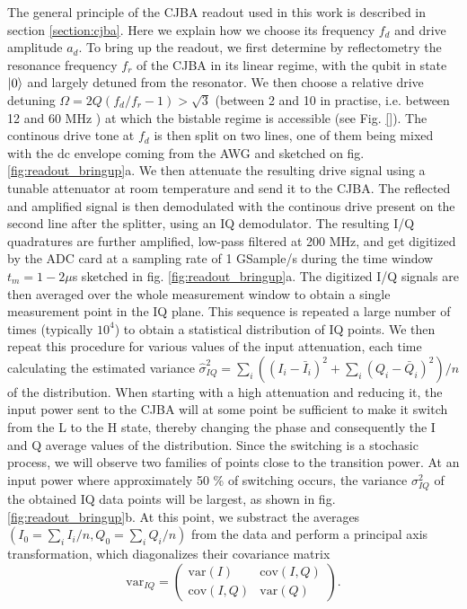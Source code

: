 The general principle of the CJBA readout used in this work is described in section \ref{section:cjba}. Here we explain how we choose its frequency $f_d$ and drive amplitude $a_d$. To bring up the readout, we first determine by reflectometry the resonance frequency $f_r$ of the CJBA in its linear regime, with the qubit in state $\left| 0 \right>$ and largely detuned from the resonator. We then choose a relative drive detuning $\Omega=2Q(f_d/f_r-1)>\sqrt{3}$  (between 2 and 10 in practise, i.e. between 12 and 60 MHz ) at which the bistable regime is accessible (see Fig. \ref{}). The continous drive tone at $f_d$ is then split on two lines, one of them being mixed with the dc envelope coming from the AWG and sketched on fig. \ref{fig:readout_bringup}a. We then attenuate the resulting drive signal using a tunable attenuator at room temperature and send it to the CJBA. The reflected and amplified signal is then demodulated with the continous drive present on the second line after the splitter, using an IQ demodulator. The resulting I/Q quadratures are further amplified, low-pass filtered at 200 MHz, and get digitized by the ADC card at a sampling rate of 1 GSample/s during the time window $t_m=1-2\mu$s sketched in fig. \ref{fig:readout_bringup}a. The digitized I/Q signals are then averaged over the whole measurement window to obtain a single measurement point in the IQ plane.  This sequence is repeated a large number of times (typically $10^4$) to obtain a statistical distribution of IQ points. We then repeat this procedure for various values of the input attenuation, each time calculating the estimated variance $\hat{\sigma}_{IQ}^2=\sum\limits_i ((I_i-\bar{I}_i)^2+\sum\limits_i (Q_i-\bar{Q}_i)^2)/n$ of the distribution. When starting with a high attenuation and reducing it, the input power sent to the CJBA will at some point be sufficient to make it switch from the L to the H state, thereby changing the phase and consequently the I and Q average values of the distribution. Since the switching is a stochasic process, we will observe two families of points close to the transition power. At an input power where approximately 50 \% of switching occurs, the variance $\sigma_{IQ}^2$ of the obtained IQ data points will be largest, as shown in fig. \ref{fig:readout_bringup}b. At this point, we substract the averages $(I_0=\sum\limits_i I_i / n,Q_0 = \sum\limits_i Q_i/n)$ from the data and perform a principal axis transformation, which diagonalizes their covariance matrix
%
\begin{equation}
\mathrm{var}_{IQ} = \left(\begin{array}{cc}\mathrm{var}(I) & \mathrm{cov}(I,Q) \\ \mathrm{cov}(I,Q) & \mathrm{var}(Q) \end{array}\right).
\end{equation}
